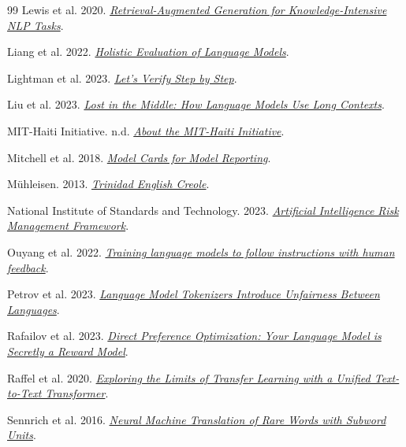 \begin{thebibliography}{99}
Lewis et al. 2020. \href{https://arxiv.org/abs/2005.11401}{\emph{Retrieval-Augmented Generation for Knowledge-Intensive NLP Tasks}}.

Liang et al. 2022. \href{https://arxiv.org/abs/2211.09110}{\emph{Holistic Evaluation of Language Models}}.

Lightman et al. 2023. \href{https://arxiv.org/abs/2305.20050}{\emph{Let's Verify Step by Step}}.

Liu et al. 2023. \href{https://arxiv.org/abs/2307.03172}{\emph{Lost in the Middle: How Language Models Use Long Contexts}}.

MIT-Haiti Initiative. n.d. \href{https://haiti.mit.edu/about/}{\emph{About the MIT-Haiti Initiative}}.

Mitchell et al. 2018. \href{https://arxiv.org/abs/1810.03993}{\emph{Model Cards for Model Reporting}}.

Mühleisen. 2013. \href{https://apics-online.info/surveys/6}{\emph{Trinidad English Creole}}.

National Institute of Standards and Technology. 2023. \href{https://www.nist.gov/itl/ai-risk-management-framework}{\emph{Artificial Intelligence Risk Management Framework}}.

Ouyang et al. 2022. \href{https://arxiv.org/abs/2203.02155}{\emph{Training language models to follow instructions with human feedback}}.

Petrov et al. 2023. \href{https://arxiv.org/abs/2305.15425}{\emph{Language Model Tokenizers Introduce Unfairness Between Languages}}.

Rafailov et al. 2023. \href{https://arxiv.org/abs/2305.18290}{\emph{Direct Preference Optimization: Your Language Model is Secretly a Reward Model}}.

Raffel et al. 2020. \href{https://jmlr.org/papers/v21/20-074.html}{\emph{Exploring the Limits of Transfer Learning with a Unified Text-to-Text Transformer}}.

Sennrich et al. 2016. \href{https://aclanthology.org/P16-1162/}{\emph{Neural Machine Translation of Rare Words with Subword Units}}.


\end{thebibliography}
